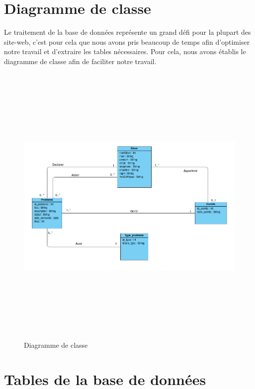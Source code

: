 \documentclass[11.5pt]{report}
\begin{document}
\section{Diagramme de classe}
Le traitement de la base de données représente un grand défi pour la plupart des site-web, c’est pour cela que nous avons pris beaucoup de temps afin d’optimiser notre travail et d’extraire les tables nécessaires. Pour cela, nous avons établis le diagramme de classe afin de faciliter notre travail.\\
\begin{figure}[h]
	
	\begin{center}
		\includegraphics[width=400pt,height=400pt]{class.png} 
		\caption{Diagramme de classe}
	\end{center}
	
\end{figure}
\section{Tables de la base de données}
\end{document}
